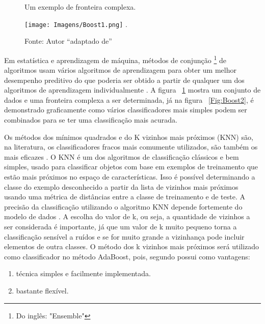 \begin{figure}[!h]
\centering \caption{Um exemplo de fronteira complexa.}
\texttt{[image: Imagens/Boost1.png]}
\DeclareGraphicsExtensions.
\caption*{Fonte: Autor ``adaptado de'' }
\label{Fig:Boostt1}
\end{figure}

Em estatística e aprendizagem de máquina, métodos de conjunção \footnote{Do inglês: "Ensemble"} de algoritmos usam vários algoritmos de aprendizagem para obter um melhor desempenho preditivo do que poderia ser obtido a partir de qualquer um dos algoritmos de aprendizagem individualmente \cite{Polikar}. A figura ~\ref{Fig:Boostt1} mostra um conjunto de dados e uma fronteira complexa a ser determinada, já na figura ~\ref{Fig:Boost2}, é demonstrado graficamente como vários classificadores mais simples podem ser combinados para se ter uma classificação mais acurada. 

Os métodos dos mínimos quadrados e do K vizinhos mais próximos (KNN) são, na literatura, os classificadores fracos mais comumente utilizados, são também os mais eficazes \cite{Avidan} \cite{Parag}. O KNN é um dos algoritmos de classificação clássicos e bem simples, usado para classificar objetos com base em exemplos de treinamento que estão mais próximos no espaço de características. Isso é possível determinando a classe do exemplo desconhecido a partir da lista de vizinhos mais próximos usando uma métrica de distâncias entre a classe de treinamento e de teste. A precisão da classificação utilizando o algoritmo KNN depende fortemente do modelo de dados \cite{DudaHart}. A escolha do valor de k, ou seja, a quantidade de vizinhos a ser considerada é importante, já que um valor de k muito pequeno torna a classificação sensível a ruídos e se for muito grande a vizinhança pode incluir elementos de outra classes. O método dos k vizinhos mais próximos será utilizado como classificador no método AdaBoost, pois, segundo  possui como vantagens:

\begin{enumerate}
	\item técnica simples e facilmente implementada.
	\item bastante flexível. 
\end{enumerate}



